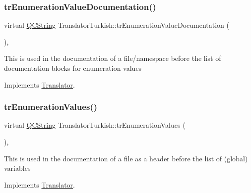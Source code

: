 \mbox{\label{class_translator_turkish_a5f65f41fa269d3e4440f178d6a976c17}} 
\subsubsection{\texorpdfstring{trEnumerationValueDocumentation()}{trEnumerationValueDocumentation()}}
{\footnotesize\ttfamily virtual \mbox{\hyperlink{class_q_c_string}{Q\+C\+String}} Translator\+Turkish\+::tr\+Enumeration\+Value\+Documentation (\begin{DoxyParamCaption}{ }\end{DoxyParamCaption})\hspace{0.3cm}{\ttfamily [inline]}, {\ttfamily [virtual]}}

This is used in the documentation of a file/namespace before the list of documentation blocks for enumeration values 

Implements \mbox{\hyperlink{class_translator}{Translator}}.

\mbox{\label{class_translator_turkish_a7d34910f01eed421feb510540b3c9d6f}} 
\subsubsection{\texorpdfstring{trEnumerationValues()}{trEnumerationValues()}}
{\footnotesize\ttfamily virtual \mbox{\hyperlink{class_q_c_string}{Q\+C\+String}} Translator\+Turkish\+::tr\+Enumeration\+Values (\begin{DoxyParamCaption}{ }\end{DoxyParamCaption})\hspace{0.3cm}{\ttfamily [inline]}, {\ttfamily [virtual]}}

This is used in the documentation of a file as a header before the list of (global) variables 

Implements \mbox{\hyperlink{class_translator}{Translator}}.

\mbox{\label{class_translator_turkish_a0e9f7aed84b75fb7ed44cbcd938e51a4}} 
